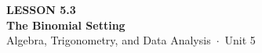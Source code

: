 \documentclass[aspectratio=169, 11pt]{beamer}
\begin{document}
{
\begin{frame}[plain]
  \vspace{2.8cm}\hspace{0.55cm}%
  \begin{minipage}{0.9\textwidth}
    {\color{goldacc}\bfseries\small LESSON 5.3}\\[0.5cm]
    {\color{white}\bfseries\LARGE The Binomial Setting}\\[1.2cm]
    {\color{mistmid}\small Algebra, Trigonometry, and Data Analysis~$\cdot$~Unit 5}
  \end{minipage}
\end{frame}
}

\begin{frame}[t, plain]
\end{frame}
\end{document}
